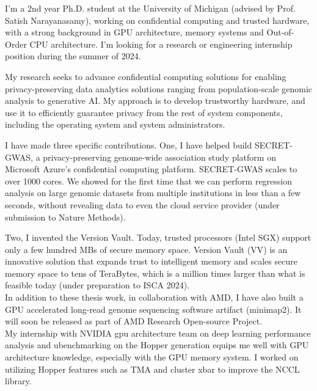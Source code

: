I'm a 2nd year Ph.D. student at the University of Michigan (advised by Prof. Satish Narayanasamy), working on confidential computing and trusted hardware, with a strong background in GPU architecture, memory systems and Out-of-Order CPU architecture. I'm looking for a research or engineering internship position during the summer of 2024. \par
My research seeks to advance confidential computing solutions for enabling privacy-preserving data analytics solutions ranging from population-scale genomic analysis to generative AI.  My approach is to develop trustworthy hardware, and use it to efficiently guarantee privacy from the rest of system components, including the operating system and system administrators. \par

\vspace{3ex}

I have made three specific contributions. One, I have helped build SECRET-GWAS, a privacy-preserving genome-wide association study platform on Microsoft Azure's confidential computing platform. SECRET-GWAS scales to over 1000 cores. We showed for the first time that we can perform regression analysis on large genomic datasets from multiple institutions in less than a few seconds, without revealing data to even the cloud service provider (under submission to Nature Methods). \par

Two, I invented the Version Vault. Today, trusted processors (Intel SGX) support only a few hundred MBs of secure memory space. Version Vault (VV) is an innovative solution that expands trust to intelligent memory and scales secure memory space to tens of TeraBytes, which is a million times larger than what is feasible today (under preparation to ISCA 2024).\\

In addition to these thesis work, in collaboration with AMD, I have also built a GPU accelerated long-read genome sequencing software artifact (minimap2). It will soon be released as part of AMD Research Open-source Project. \\

My internship with NVIDIA gpu architecture team on deep learning performance analysis and ubenchmarking on the Hopper generation equips me well with GPU architecture knowledge, especially with the GPU memory system. I worked on utilizing Hopper features such as TMA and cluster xbar to improve the NCCL library. \\

